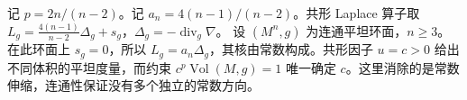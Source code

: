 \begin{example}\label{g3:exm:yamabe-flat-normalization}
	记 \(p=2n/(n-2)\)。记 \(a_n=4(n-1)/(n-2)\)。共形 Laplace 算子取 \(L_g=\tfrac{4(n-1)}{n-2}\Delta_g+s_g\)，\(\Delta_g=-\operatorname{div}_g\nabla\)。
	设 \((M^n,g)\) 为连通平坦环面，\(n\ge3\)。在此环面上 \(s_g=0\)，所以 \(L_g=a_n\Delta_g\)，其核由常数构成。共形因子 \(u=c>0\) 给出不同体积的平坦度量，而约束 \(c^p\operatorname{Vol}(M,g)=1\) 唯一确定 \(c\)。这里消除的是常数伸缩，连通性保证没有多个独立的常数方向。
\end{example}
